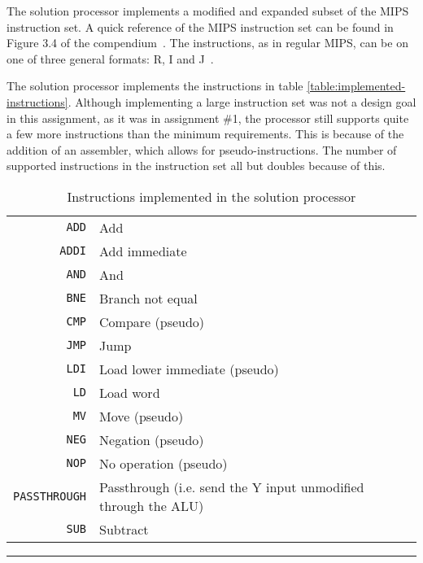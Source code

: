 The solution processor implements a modified and expanded subset of the MIPS instruction set.
A quick reference of the MIPS instruction set can be found in Figure 3.4 of the compendium~\cite[p.112]{compendium}.
The instructions, as in regular MIPS, can be on one of three general formats: R, I and J~\cite[p.109-11]{compendium}.

The solution processor implements the instructions in table \vref{table:implemented-instructions}.
Although implementing a large instruction set was not a design goal in this assignment, as it was in assignment \#1\cite{assignment-1}, the processor still supports quite a few more instructions than the minimum requirements.
This is because of the addition of an assembler, which allows for pseudo-instructions.
The number of supported instructions in the instruction set all but doubles because of this.

\begin{table}[H]
    \begin{center}
        \begin{tabular}{r|l}
            \texttt{ADD} & Add \\
            \texttt{ADDI} & Add immediate \\
            \texttt{AND} & And \\
            \texttt{BNE} & Branch not equal \\
            \texttt{CMP} & Compare (pseudo) \\
            \texttt{JMP} & Jump \\
            \texttt{LDI} & Load lower immediate (pseudo) \\
            \texttt{LD} & Load word \\
            \texttt{MV} & Move (pseudo) \\
            \texttt{NEG} & Negation (pseudo) \\
            \texttt{NOP} & No operation (pseudo) \\
            \texttt{PASSTHROUGH} & Passthrough (i.e. send the Y input unmodified through the ALU) \\
            \texttt{SUB} & Subtract \\
        \end{tabular}
        \smallskip
        \hrule
        \smallskip
        \caption{Instructions implemented in the solution processor}
        \label{table:implemented-instructions}
    \end{center}
\end{table}
